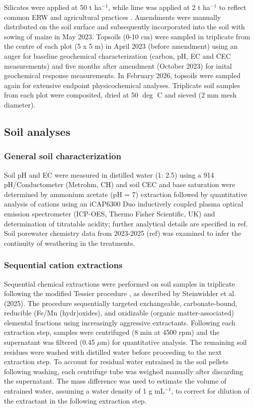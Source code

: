 \documentclass[preprint,12pt]{elsarticle}
\begin{document}
Silicates were applied at 50 t ha$^{-1}$, while lime was applied at 2 t ha$^{-1}$ to reflect common ERW and agricultural practices \citep{steinwidder2025beyond}. Amendments were manually distributed on the soil surface and subsequently incorporated into the soil with sowing of maize in May 2023. Topsoils (0-10 cm) were sampled in triplicate from the centre of each plot (5 x 5 m) in April 2023 (before amendment) using an auger for baseline geochemical characterization (carbon, pH, EC and CEC measurements) and five months after amendment (October 2023) for inital geochemical response measurements. In February 2026, topsoils were sampled again for extensive endpoint physicochemical analyses. Triplicate soil samples from each plot were composited, dried at 50 $\deg$ C and sieved (2 mm mesh diameter). 
  
\subsection{Soil analyses}
\label{subsec:soil_analyses}

\subsubsection{General soil characterization}
  
Soil pH and EC were measured in distilled water (1: 2.5) using a 914 pH/Conductometer (Metrohm, CH) and soil CEC and base saturation were determined by ammonium acetate (pH = 7) extraction followed by quantitative analysis of cations using an iCAP6300 Duo inductively coupled plasma optical emission spectrometer (ICP-OES, Thermo Fisher Scientific, UK) and determination of titratable acidity; further analytical details are specified in ref. Soil porewater chemistry data from 2023-2025 (ref) was examined to infer the continuity of weathering in the treatments. 

\subsubsection{Sequential cation extractions}

Sequential chemical extractions were performed on soil samples in triplicate following the modified Tessier procedure \citep{Tessier1979}, as described by Steinwidder et al. (2025). The procedure sequentially targeted exchangeable, carbonate-bound, reducible (Fe/Mn (hydr)oxides), and oxidizable (organic matter-associated) elemental fractions using increasingly aggressive extractants. Following each extraction step, samples were centrifuged (8 min at 4500 rpm) and the supernatant was filtered (0.45 $\mu$m) for quantitative analysis. The remaining soil residues were washed with distilled water before proceeding to the next extraction step. To account for residual water entrained in the soil pellets following washing, each centrifuge tube was weighed manually after discarding the supernatant. The mass difference was used to estimate the volume of entrained water, assuming a water density of 1 g mL\(^{-1}\), to correct for dilution of the extractant in the following extraction step. 
\end{document}

